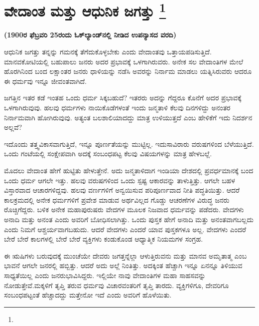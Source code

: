
\chapter[ವೇದಾಂತ ಮತ್ತು ಆಧುನಿಕ ಜಗತ್ತು ]{ವೇದಾಂತ ಮತ್ತು ಆಧುನಿಕ ಜಗತ್ತು \protect\footnote{}}

\centerline{\textbf{(1900ರ ಫೆಬ್ರವರಿ 25ರಂದು ಓಕ್​ಲ್ಯಾಂಡ್​ನಲ್ಲಿ ನೀಡಿದ ಉಪನ್ಯಾಸದ ವರದಿ)}}

\vskip 0.3cm

ಆಧುನಿಕ ಜಗತ್ತು ತನ್ನನ್ನು ಗಮನಕ್ಕೆ ತೆಗೆದುಕೊಳ್ಳಬೇಕು ಎಂದು ವೇದಾಂತವು ಒತ್ತಾಯಪಡಿಸುತ್ತಿದೆ. ಮಾನವಕೋಟಿಯಲ್ಲಿ ಬಹುಪಾಲು ಜನರು ಅದರ ಪ್ರಭಾವಕ್ಕೆ ಒಳಗಾಗಿರುವರು. ಅನೇಕ ಸಲ ವೇದಾಂತಿಗಳ ಮೇಲೆ ಹೊರಗಿನಿಂದ ಬಂದ ಲಕ್ಷಾಂತರ ಜನರು ಧಾಳಿಯನ್ನು ನಡೆಸಿ ಅವರನ್ನು ನಿರ್ನಾಮ ಮಾಡಲು ಯತ್ನಿಸಿರುವರು ಆದರೂ ಈ ಧರ್ಮವು ಇನ್ನೂ ಜೀವಂತವಾಗಿದೆ.

\vskip 3pt

ಜಗತ್ತಿನ ಇತರ ಕಡೆ ಇಂತಹ ಒಂದು ಧರ್ಮ ಸಿಕ್ಕಬಹುದೆ? ಇತರರು ಅದನ್ನು ಗೆದ್ದರೂ ಕೊನೆಗೆ ಅದರ ಪ್ರಭಾವಕ್ಕೆ ಒಳಗಾಗಿರುವುವು. ಹಲವು ಧರ್ಮಗಳು ನಾಯಿಕೊಡೆಗಳಂತೆ ಇಂದು ಜನ್ಮತಾಳಿ ಕೆಲವು ದಿನಗಳಿದ್ದು ಅನಂತರ ನಿರ್ನಾಮವಾಗಿ ಹೋಗಿರುವುವು. ಅತ್ಯಂತ ಬಲಶಾಲಿಯಾದದ್ದು ಮಾತ್ರ ಉಳಿಯುತ್ತದೆ ಎಂಬ ಹೇಳಿಕೆಗೆ ಇದು ನಿದರ್ಶನ ಅಲ್ಲವೆ?

\vskip 3pt

ಇದೊಂದು ತತ್ತ್ವವಿಕಾಸವಾಗುತ್ತಿದೆ, ಇನ್ನೂ ಪೂರ್ಣತೆಯನ್ನು ಮುಟ್ಟಿಲ್ಲ. ಇದು\break ಸಾವಿರಾರು ವರುಷಗಳಿಂದ ಬೆಳೆಯುತ್ತಿದೆ. ಒಂದು ಗಂಟೆಯಲ್ಲಿ ಸಂಕ್ಷೇಪವಾಗಿ ಅದಕ್ಕೆ ಸಂಬಂಧಪಟ್ಟ ಕೆಲವು ವಿಷಯಗಳನ್ನು ಮಾತ್ರ ಹೇಳಬಲ್ಲೆ.

\vskip 3pt

ಮೊದಲು ವೇದಾಂತ ಹೇಗೆ ಹುಟ್ಟಿತು ಹೇಳುತ್ತೇನೆ. ಅದು ಜನ್ಮತಾಳಿದಾಗ ಇಂಡಿಯಾ ದೇಶದಲ್ಲಿ ಪ್ರವರ್ಧಮಾನಕ್ಕೆ ಬಂದ ಒಂದು ಧರ್ಮ ಆಗಲೇ ಇತ್ತು. ಹಲವು ವರುಷಗಳಿಂದ ಒಂದು ಸ್ಪಷ್ಟ ಆಕಾರವನ್ನು ತಾಳುತ್ತಿತ್ತು. ಆಗಲೇ ಬಹಳ ವಿಸ್ತಾರವಾದ ಆಚಾರಗಳಿದ್ದವು. ಹಲವು ವರ್ಣಗಳಿಗೆ ಅನ್ವಯಿಸುವ ಪರಿಪೂರ್ಣವಾದ ನೀತಿ ಪದ್ಧತಿಯಿತ್ತು. ಆದರೆ ಕಾಲಕ್ರಮದಲ್ಲಿ ಅನೇಕ ಧರ್ಮಗಳಿಗೆ ಪ್ರವೇಶ ಮಾಡುವ ಅರ್ಥವಿಲ್ಲದ ಗೊಡ್ಡು ಆಚರಣೆಗಳ ವಿರುದ್ಧ ಜನರು ರೊಚ್ಚಿಗೆದ್ದರು. ಬಳಿಕ ಅನೇಕ ಮಹಾಪುರುಷರು ವೇದಗಳ ಮೂಲಕ ನಿಜವಾದ ಧರ್ಮವನ್ನು ಪಡೆದರು. ವೇದಗಳು ಅನಾದಿ ಮತ್ತು ಅನಂತ ಎಂದು ಅವರಿಗೆ ಬೋಧಿಸಲಾಗಿತ್ತು. ಒಂದು ಪುಸ್ತಕ ಹೇಗೆ ಅನಾದಿ ಮತ್ತು ಅನಂತವಾಗಬಲ್ಲದು ಎಂದು ನಿಮಗೆ ಆಶ್ಚರ್ಯವಾಗಬಹುದು. ಆದರೆ ವೇದಗಳು ಎಂದರೆ ಯಾವ ಪುಸ್ತಕಗಳೂ ಅಲ್ಲ. ವೇದಗಳು ಎಂದರೆ ಬೇರೆ ಬೇರೆ ಕಾಲಗಳಲ್ಲಿ ಬೇರೆ ಬೇರೆ ವ್ಯಕ್ತಿಗಳು ಕಂಡುಕೊಂಡ ಆಧ್ಯಾತ್ಮಿಕ ನಿಯಮಗಳ ಸಂಗ್ರಹ.

\vskip 3pt

ಈ ಋಷಿಗಳು ಬರುವುದಕ್ಕೆ ಮುಂಚೆಯೇ ದೇವರು ಜಗತ್ತನ್ನೆಲ್ಲಾ ಆಳುತ್ತಿರುವನು ಮತ್ತು ಮಾನವ ಅಮೃತಾತ್ಮ ಎಂಬ ಭಾವನೆ ಆಗಲೇ ಜನರಲ್ಲಿ ಹಬ್ಬಿತ್ತು. ಆದರೆ ಅದು ಅಲ್ಲೆ ನಿಂತಿತ್ತು. ಅದಕ್ಕಿಂತ ಹೆಚ್ಚಾಗಿ ಇನ್ನೂ ಏನನ್ನೂ ತಿಳಿಯುವ ಸಾಧ್ಯತೆಯಿಲ್ಲ ಎಂದು ಜನರು\break ಭಾವಿಸಿದ್ದರು. ಇಲ್ಲಿಯೇ ನಾವು ವೇದಾಂತಿಗಳ ಮಹಾ ಸಾಹಸವನ್ನು ನೋಡುತ್ತೇವೆ.\break ಮಕ್ಕಳಿಗೆ ತೃಪ್ತಿ ತರುವ ಧರ್ಮವು ವಿಚಾರವಂತರಿಗೆ ತೃಪ್ತಿ ತಾರದು. ವ್ಯಕ್ತಿಗಳಿಗೂ, ದೇವರಿಗೂ ಸಂಬಂಧಪಟ್ಟಂತೆ ಹೆಚ್ಚಾದದ್ದು ಮತ್ತೇನೋ ಇದೆ ಎಂದು ಅವರಿಗೆ ಹೊಳೆಯಿತು.

